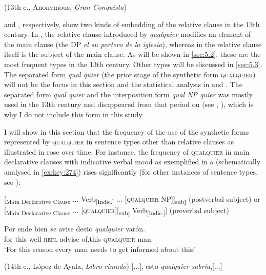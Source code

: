     (13th c., Anonymous, \textit{Gran Conquista})
\z
\z

 and , respectively, show two kinds of embedding of the relative clause in the 13th century. In , the relative clause introduced by \textit{qualquier} modifies an element of the main clause (the DP \textit{el su portero de la iglesia}), whereas in  the relative clause itself is the subject of the main clause. As will be shown in \ref{sec:5.2}, these are the most frequent types in the 13th century. Other types will be discussed in \ref{sec:5.3}. The separated form \textit{qual quier} (the prior stage of the synthetic form \textsc{qualquier}) will not be the focus in this section and the statistical analysis in  and . The separated form \textit{qual quier} and the interposition form \textit{qual NP quier} was mostly used in the 13th century and disappeared from that period on (see \citealt{cp2009}, \citealt{Pato2012}), which is why I do not include this form in this study.

I will show in this section that the frequency of the use of the synthetic forms represented by \textsc{qualquier} in sentence types other than relative clauses as illustrated in  rose over time. For instance, the frequency of \textsc{qualquier} in main declarative clauses with indicative verbal mood as exemplified in a (schematically analysed in \ref{ex:key:274}) rises significantly (for other instances of sentence types, see ):

\ea \label{ex:key:274}
\ea{} \label{ex:key:274-1} [\textsubscript{Main Declarative Clause} ... Verb\textsubscript{[Indic.]} ... [\textsc{qualquier} NP]]\textsubscript{subj}    (postverbal subject) or
\ex{} \label{ex:key:274-2} [\textsubscript{Main Declarative Clause} ... [\textsc{qualquier}][\textsubscript{subj} Verb\textsubscript{[Indic.]}]  (preverbal subject)
\z
\z

\ea \label{ex:key:275}
\ea \label{ex:key:275-1} \gll Por ende bien \textit{se} {avise} desto \textit{qualquier} varón.\\
for this well \textsc{refl} advise of.this \textsc{qualquier} man\\
    \glt ‘For this reason every man needs to get informed about this.’

    (14{th} c., López de Ayala, \textit{Libro rimado})
\ex{} \label{ex:key:275-2} [...], esto \textit{qualquier} \textit{sabría},[...]

